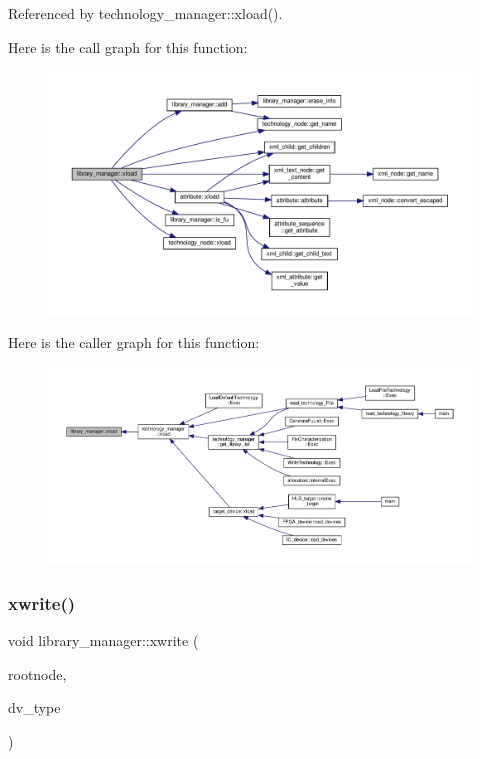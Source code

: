 Referenced by technology\+\_\+manager\+::xload().

Here is the call graph for this function\+:
\nopagebreak
\begin{figure}[H]
\begin{center}
\leavevmode
\includegraphics[width=350pt]{d8/d35/classlibrary__manager_a2256397a16a3d834c1cf9921824316be_cgraph}
\end{center}
\end{figure}
Here is the caller graph for this function\+:
\nopagebreak
\begin{figure}[H]
\begin{center}
\leavevmode
\includegraphics[width=350pt]{d8/d35/classlibrary__manager_a2256397a16a3d834c1cf9921824316be_icgraph}
\end{center}
\end{figure}
\mbox{\label{classlibrary__manager_a696beb5208cbe5a27144d59757b72682}} 
\subsubsection{\texorpdfstring{xwrite()}{xwrite()}}
{\footnotesize\ttfamily void library\+\_\+manager\+::xwrite (\begin{DoxyParamCaption}\item[{\hyperlink{classxml__element}{xml\+\_\+element} $\ast$}]{rootnode,  }\item[{\hyperlink{target__device_8hpp_a476becc690220f0805ce73006449c732}{Target\+Device\+\_\+\+Type}}]{dv\+\_\+type }\end{DoxyParamCaption})}



